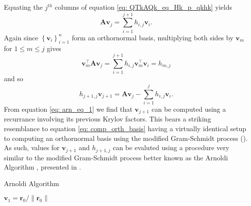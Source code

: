 Equating the $j^{th}$ columns of equation \ref{eq: QTkAQk_eq_Hk_p_qkhk} yields
\[
    \bm{A} \bm{v}_j = \sum_{i=1}^{j+1} h_{i,j} \bm{v}_{i}.
\]
Again since $\left\{ \bm{v}_i \right\}_{i=1}^{n}$ form an orthornormal basis, multiplying both sides by $\bm{v}_m$ for $1 \leq m \leq j$ gives
\[
    \bm{v}_m^{\intercal} \bm{A} \bm{v}_j = \sum_{i=1}^{j+1} h_{i,j} \bm{v}_m^{\intercal} \bm{v}_{i} = h_{m,j}
\]
and so
\begin{equation}\label{eq: arn_eq_1}
    h_{j+1,j} \bm{v}_{j+1} = \bm{A} \bm{v}_j - \sum_{i=1}^{j} h_{i,j} \bm{v}_{i}.
\end{equation}
From equation \ref{eq: arn_eq_1} we find that $\bm{v}_{j+1}$ can be computed using a recurrance involving its previous Krylov factors. This bears a striking resemblance to equation \ref{eq: comp_orth_basis} having a virtually identical setup to computing an orthornormal basis using the modified Gram-Schmidt process (). As such, values for $\bm{v}_{j+1}$ and $h_{j+1,j}$ can be evaluted using a procedure very similar to the modified Gram-Schmidt process better known as the Arnoldi Algorithm \cite{TrefethenLloydN.LloydNicholas1997Nla/,DemmelJamesW1997Anla}, presented in .

{\centering
\begin{minipage}{.85\linewidth}
    \begin{algorithm}[H]
        \caption{Arnoldi Algorithm}
        \label{alg: Arnoldi_Algorithm}
        \SetAlgoLined
        \DontPrintSemicolon

        \BlankLine
        $\bm{v}_1 = \bm{r}_0 / \| \bm{r}_0 \|$\;
        \BlankLine
    \end{algorithm}
\end{minipage}
\par
}

